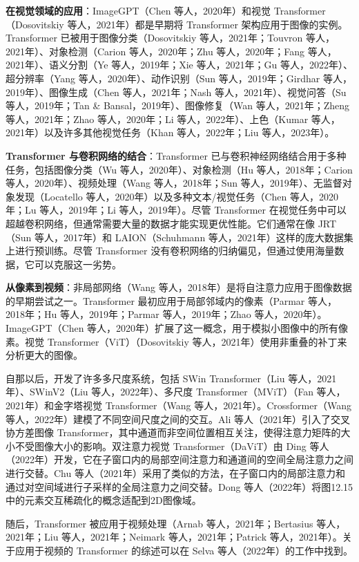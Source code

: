 \documentclass[lang=cn,newtx,10pt,scheme=chinese]{elegantbook}
\begin{document}
\textbf{在视觉领域的应用}：ImageGPT（Chen 等人，2020年）和视觉 Transformer（Dosovitskiy 等人，2021年）都是早期将 Transformer 架构应用于图像的实例。Transformer 已被用于图像分类（Dosovitskiy 等人，2021年；Touvron 等人，2021年）、对象检测（Carion 等人，2020年；Zhu 等人，2020年；Fang 等人，2021年）、语义分割（Ye 等人，2019年；Xie 等人，2021年；Gu 等人，2022年）、超分辨率（Yang 等人，2020年）、动作识别（Sun 等人，2019年；Girdhar 等人，2019年）、图像生成（Chen 等人，2021年；Nash 等人，2021年）、视觉问答（Su 等人，2019年；Tan \& Bansal，2019年）、图像修复（Wan 等人，2021年；Zheng 等人，2021年；Zhao 等人，2020年；Li 等人，2022年）、上色（Kumar 等人，2021年）以及许多其他视觉任务（Khan 等人，2022年；Liu 等人，2023年）。

\textbf{Transformer 与卷积网络的结合}：Transformer 已与卷积神经网络结合用于多种任务，包括图像分类（Wu 等人，2020年）、对象检测（Hu 等人，2018年；Carion 等人，2020年）、视频处理（Wang 等人，2018年；Sun 等人，2019年）、无监督对象发现（Locatello 等人，2020年）以及多种文本/视觉任务（Chen 等人，2020年；Lu 等人，2019年；Li 等人，2019年）。尽管 Transformer 在视觉任务中可以超越卷积网络，但通常需要大量的数据才能实现更优性能。它们通常在像 JRT（Sun 等人，2017年）和 LAION（Schuhmann 等人，2021年）这样的庞大数据集上进行预训练。尽管 Transformer 没有卷积网络的归纳偏见，但通过使用海量数据，它可以克服这一劣势。

\textbf{从像素到视频}：非局部网络（Wang 等人，2018年）是将自注意力应用于图像数据的早期尝试之一。Transformer 最初应用于局部邻域内的像素（Parmar 等人，2018年；Hu 等人，2019年；Parmar 等人，2019年；Zhao 等人，2020年）。ImageGPT（Chen 等人，2020年）扩展了这一概念，用于模拟小图像中的所有像素。视觉 Transformer（ViT）（Dosovitskiy 等人，2021年）使用非重叠的补丁来分析更大的图像。

自那以后，开发了许多多尺度系统，包括 SWin Transformer（Liu 等人，2021年）、SWinV2（Liu 等人，2022年）、多尺度 Transformer（MViT）（Fan 等人，2021年）和金字塔视觉 Transformer（Wang 等人，2021年）。Crossformer（Wang 等人，2022年）建模了不同空间尺度之间的交互。Ali 等人（2021年）引入了交叉协方差图像 Transformer，其中通道而非空间位置相互关注，使得注意力矩阵的大小不受图像大小的影响。双注意力视觉 Transformer（DaViT）由 Ding 等人（2022年）开发，它在子窗口内的局部空间注意力和通道间的空间全局注意力之间进行交替。Chu 等人（2021年）采用了类似的方法，在子窗口内的局部注意力和通过对空间域进行子采样的全局注意力之间交替。Dong 等人（2022年）将图12.15中的元素交互稀疏化的概念适配到2D图像域。

随后，Transformer 被应用于视频处理（Arnab 等人，2021年；Bertasius 等人，2021年；Liu 等人，2021年；Neimark 等人，2021年；Patrick 等人，2021年）。关于应用于视频的 Transformer 的综述可以在 Selva 等人（2022年）的工作中找到。
\end{document}
